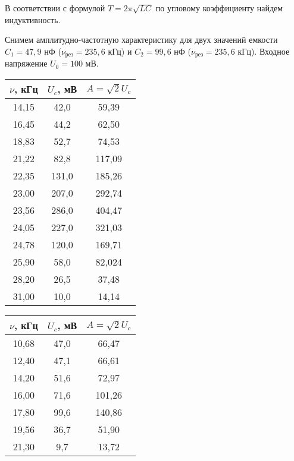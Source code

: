 	В соответствии с формулой $T = 2 \pi \sqrt{L C}$ по угловому коэффициенту найдем индуктивность.
	
	\begin{center}
	\end{center}

	Снимем амплитудно-частотную характеристику для двух значений емкости $C_1 = 47,9$ нФ ($\nu_{\text{рез}} = 235,6$ кГц) и $C_2 = 99,6$ нФ ($\nu_{\text{рез}} = 235,6$ кГц). Входное напряжение $U_0 = 100$ мВ.
	
	\newpage
	
	\begin{table}[h!]
		\begin{center}
			\begin{tabular}{|c|c|c|}
				\hline
				$\nu$, кГц & $U_c$, мВ & $A = \sqrt{2} U_c$ \\ \hline
				14,15      & 42,0      & 59,39  \\ \hline
				16,45      & 44,2      & 62,50  \\ \hline
				18,83      & 52,7      & 74,53  \\ \hline
				21,22      & 82,8      & 117,09 \\ \hline
				22,35      & 131,0     & 185,26 \\ \hline
				23,00      & 207,0     & 292,74 \\ \hline
				23,56      & 286,0     & 404,47 \\ \hline
				24,05      & 227,0     & 321,03 \\ \hline
				24,78      & 120,0     & 169,71 \\ \hline
				25,90      & 58,0      & 82,024 \\ \hline
				28,20      & 26,5      & 37,48  \\ \hline
				31,00      & 10,0      & 14,14  \\ \hline
			\end{tabular}
		\end{center}
	\end{table}

	\begin{table}[h!]
		\begin{center}
			\begin{tabular}{|c|c|c|}
				\hline
				$\nu$, кГц & $U_c$, мВ & $A = \sqrt{2} U_c$ \\ \hline
				10,68      & 47,0      & 66,47  \\ \hline
				12,40      & 47,1      & 66,61  \\ \hline
				14,20      & 51,6      & 72,97  \\ \hline
				16,00      & 71,6      & 101,26 \\ \hline
				17,80      & 99,6      & 140,86 \\ \hline
				19,56      & 36,7      & 51,90  \\ \hline
				21,30      & 9,7       & 13,72  \\ \hline
			\end{tabular}
		\end{center}
	\end{table}

	
